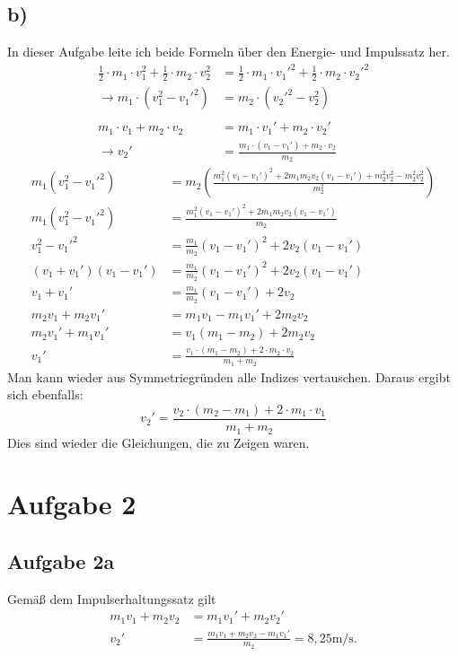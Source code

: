 \documentclass[a4paper,10pt]{extarticle}
\begin{document}
\subsection*{b)}
In dieser Aufgabe leite ich beide Formeln über den Energie- und Impulssatz her.
\begin{align*}
\frac{1}{2}\cdot m_1\cdot v_1^2+\frac{1}{2}\cdot m_2\cdot v_2^2&=\frac{1}{2}\cdot m_1\cdot v_1'^2+\frac{1}{2}\cdot m_2\cdot v_2'^2\\
\rightarrow m_1\cdot(v_1^2-v_1'^2)&=m_2\cdot(v_2'^2-v_2^2)\\ \\
m_1\cdot v_1+m_2\cdot v_2&=m_1\cdot v_1'+m_2\cdot v_2'\\
\rightarrow v_2'&=\frac{m_1\cdot(v_1-v_1')+m_2\cdot v_2}{m_2}
\end{align*}
\begin{align*}
m_1(v_1^2-v_1'^2)&=m_2\left(\frac{m_1^2(v_1-v_1')^2+2m_1m_2v_2(v_1-v_1')+m_2^2v_2^2-m_2^2v_2^2}{m_2^2}\right)\\
m_1(v_1^2-v_1'^2)&=\frac{m_1^2(v_1-v_1')^2+2m_1m_2v_2(v_1-v_1')}{m_2}\\
v_1^2-v_1'^2&=\frac{m_1}{m_2}(v_1-v_1')^2+2v_2(v_1-v_1')\\
(v_1+v_1')(v_1-v_1')&=\frac{m_1}{m_2}(v_1-v_1')^2+2v_2(v_1-v_1')\\
v_1+v_1'&=\frac{m_1}{m_2}(v_1-v_1')+2v_2\\
m_2v_1+m_2v_1'&=m_1v_1-m_1v_1'+2m_2v_2\\
m_2v_1'+m_1v_1'&=v_1(m_1-m_2)+2m_2v_2\\
v_1'&=\frac{v_1\cdot(m_1-m_2)+2\cdot m_2\cdot v_2}{m_1+m_2}
\end{align*}
Man kann wieder aus Symmetriegründen alle Indizes vertauschen. Daraus ergibt sich ebenfalls:
\begin{equation*}
v_2'=\frac{v_2\cdot(m_2-m_1)+2\cdot m_1\cdot v_1}{m_1+m_2}
\end{equation*}
Dies sind wieder die Gleichungen, die zu Zeigen waren.

\section*{Aufgabe 2}
\subsection*{Aufgabe 2a}
Gemäß dem Impulserhaltungssatz gilt
\begin{align*}
  m_1v_1 + m_2v_2 &= m_1v_1'+m_2v_2'\\
  v_2'&=\frac{m_1v_1 + m_2v_2 - m_1v_1'}{m_2} = 8,25 \mbox{m/s.}
\end{align*}
\end{document}
